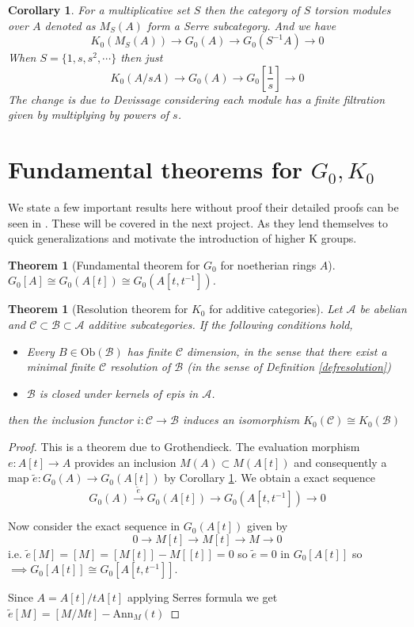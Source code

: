\documentclass[12pt]{report}
\numberwithin{equation}{section}
\newtheorem{theorem}[dummy]{Theorem}
\newtheorem{corollary}[dummy]{Corollary}
\begin{document}
	\begin{corollary}\label{localizationk0corrolary}
		For a multiplicative set $S$ then the category of $S$ torsion modules over $A$ denoted as $M_S(A)$ form a Serre subcategory. And we have \[ K_0(M_S(A) ) \to G_0(A) \to G_0(S^{-1}A) \to 0 \]
		When $S=\{1,s,s^2,\cdots \}$ then just \[ K_0(A/sA) \to G_0(A) \to G_0[\frac{1}{s}]	 \to 0\]
		The change is due to Devissage considering each module has a finite filtration given by multiplying by powers of $s$.
	\end{corollary}
	
	
	\section{Fundamental theorems for $G_0, K_0$}
	We state a few important results here without proof their detailed proofs can be seen in \cite{weibel2013k}. These will be covered in the next project. As they lend themselves to quick generalizations and motivate the introduction of higher K groups.
	\begin{theorem}[Fundamental theorem for $G_0$ for noetherian rings $A$]\label{g0fund}
		$G_0[A] \cong G_0(A[t]) \cong G_0(A[t,t^{-1}])$.
	\end{theorem}
	\begin{theorem}[Resolution theorem for $K_0$ for additive categories]
		Let $\mathcal{A}$ be abelian and $\mathcal{C} \subset \mathcal{B} \subset \mathcal{A}$ additive subcategories. If the following conditions hold,
		\begin{itemize}
			\item Every $B \in \mathrm{Ob}(\mathcal{B})$ has finite $\mathcal{C}$ dimension, in the sense that there exist a minimal finite $\mathcal{C}$ resolution of $\mathcal{B}$ (in the sense of Definition \ref{defresolution})
			\item $\mathcal{B}$ is closed under kernels of epis in $\mathcal{A}$.
		\end{itemize}
		then the inclusion functor $i:\mathcal{C } \to \mathcal{B}$ induces an isomorphism $K_0(\mathcal{C}) \cong K_0(\mathcal{B})$
	\end{theorem}
	
	\begin{proof}
		This is a theorem due to Grothendieck.
		The evaluation morphism $e: A[t] \to A$ provides an inclusion $M(A) \subset M(A[t])$ and consequently a map $\tilde{e}: G_0(A) \to G_0(A[t])$ by Corollary \ref{localizationk0corrolary}. We obtain a exact sequence \[ G_0(A) \xrightarrow{\tilde{e}} G_0(A[t]) \to G_0(A[t,t^{-1}]) \to 0 \]
		
		Now consider the exact sequence in $G_0(A[t])$ given by \[ 0 \to M[t]\to M[t] \to M \to 0 \] i.e. $\tilde e [M]=[M]=[M[t]]-M[[t]]=0$ so $\tilde e =0$ in $G_0[A[t]]$ so $ \implies G_0[A[t]] \cong G_0[A[t,t^{-1	}]]$.
		
		Since $A=A[t]/tA[t]$ applying Serres formula we get $\tilde e [M]=[M/Mt]- \mathrm{Ann}_M(t)$
	\end{proof}
	
\end{document}

